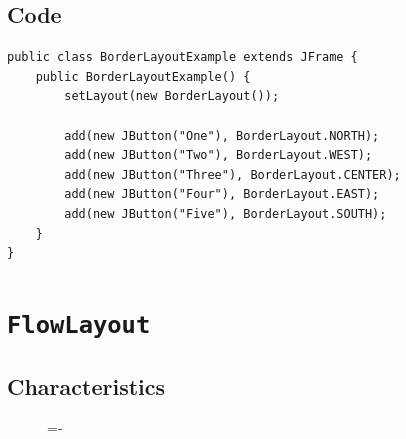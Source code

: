 \documentclass[a4paper]{systems-software}
\begin{document}
\subsection*{Code}

\begin{lstlisting}[title={A BorderLayout class.}]
public class BorderLayoutExample extends JFrame {
	public BorderLayoutExample() {
		setLayout(new BorderLayout());
		
		add(new JButton("One"), BorderLayout.NORTH);
		add(new JButton("Two"), BorderLayout.WEST);
		add(new JButton("Three"), BorderLayout.CENTER);
		add(new JButton("Four"), BorderLayout.EAST);
		add(new JButton("Five"), BorderLayout.SOUTH);
	}
}
\end{lstlisting}


\section*{\texttt{FlowLayout}}

\subsection*{Characteristics}

\begin{figure}[H]
	\lineskip=-\fboxrule
\end{figure}
\end{document}
